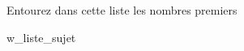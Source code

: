 \begin{exo}
    Entourez dans cette liste les nombres premiers
\end{exo}

\vspace{0.5cm}

{\centering

{
    {w_liste_sujet}
}

}
